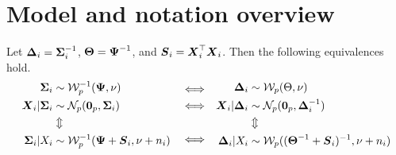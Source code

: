 \documentclass{article}\usepackage[]{graphicx}\usepackage[]{color}
\begin{document}
\section{Model and notation overview}
Let ${\boldsymbol{\Delta}}_i = {\boldsymbol{\Sigma}}_i^{-1}$, ${\boldsymbol{\Theta}} = {\boldsymbol{\Psi}}^{-1}$, and ${\boldsymbol{S}}_i = {\boldsymbol{X}}_i^\top {\boldsymbol{X}}_i$. Then the following equivalences hold.
\begin{equation*}
\begin{aligned}
  {\boldsymbol{\Sigma}}_i &\sim \mathcal{W}^{-1}_p({\boldsymbol{\Psi}}, \nu) \\
  {\boldsymbol{X}}_i | {\boldsymbol{\Sigma}}_i &\sim \mathcal{N}_p(\boldsymbol{0}_p, {\boldsymbol{\Sigma}}_i) \\
  &\Updownarrow \\
  {\boldsymbol{\Sigma}}_i | X_i  &\sim \mathcal{W}^{-1}_p({\boldsymbol{\Psi}} + {\boldsymbol{S}}_i, \nu + n_i)
\end{aligned}
\begin{aligned}
\quad
&\Longleftrightarrow \\
&\Longleftrightarrow \\
\\
&\Longleftrightarrow
\quad
\end{aligned}
\begin{aligned}
  {\boldsymbol{\Delta}}_i &\sim \mathcal{W}_p(\Theta, \nu) \\
  {\boldsymbol{X}}_i | {\boldsymbol{\Delta}}_i &\sim \mathcal{N}_p(\boldsymbol{0}_p, {\boldsymbol{\Delta}}_i^{-1}) \\
  &\Updownarrow \\
  {\boldsymbol{\Delta}}_i | X_i  &\sim \mathcal{W}_p(({\boldsymbol{\Theta}}^{-1} + {\boldsymbol{S}}_i)^{-1}, \nu + n_i)
\end{aligned}
\end{equation*}

\listoffixmes
\end{document}
